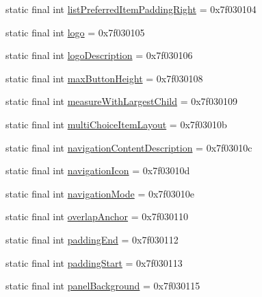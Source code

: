 \begin{DoxyCompactItemize}
\item 
static final int \mbox{\hyperlink{classcom_1_1google_1_1android_1_1gms_1_1R_1_1attr_ad62342bccd24186502c5a787bbd476b5}{list\+Preferred\+Item\+Padding\+Right}} = 0x7f030104
\item 
static final int \mbox{\hyperlink{classcom_1_1google_1_1android_1_1gms_1_1R_1_1attr_a280634c4d3de6b87fbf3f1e89e7efb5d}{logo}} = 0x7f030105
\item 
static final int \mbox{\hyperlink{classcom_1_1google_1_1android_1_1gms_1_1R_1_1attr_a640dccb545bc7628f4e6db51f8054219}{logo\+Description}} = 0x7f030106
\item 
static final int \mbox{\hyperlink{classcom_1_1google_1_1android_1_1gms_1_1R_1_1attr_a02299476fb7ab67a40dc0dd31f397a02}{max\+Button\+Height}} = 0x7f030108
\item 
static final int \mbox{\hyperlink{classcom_1_1google_1_1android_1_1gms_1_1R_1_1attr_a81d342201cb6c67c755cf47c538f899c}{measure\+With\+Largest\+Child}} = 0x7f030109
\item 
static final int \mbox{\hyperlink{classcom_1_1google_1_1android_1_1gms_1_1R_1_1attr_aa44d3c7ba7f50713fb422676563d91e5}{multi\+Choice\+Item\+Layout}} = 0x7f03010b
\item 
static final int \mbox{\hyperlink{classcom_1_1google_1_1android_1_1gms_1_1R_1_1attr_acc258d70880647b3e6018a260189eea3}{navigation\+Content\+Description}} = 0x7f03010c
\item 
static final int \mbox{\hyperlink{classcom_1_1google_1_1android_1_1gms_1_1R_1_1attr_a53d06a7250ee56f3ab640990d1d301f3}{navigation\+Icon}} = 0x7f03010d
\item 
static final int \mbox{\hyperlink{classcom_1_1google_1_1android_1_1gms_1_1R_1_1attr_a395d03f137b00a2001096d315a5b9cf2}{navigation\+Mode}} = 0x7f03010e
\item 
static final int \mbox{\hyperlink{classcom_1_1google_1_1android_1_1gms_1_1R_1_1attr_a0e6609ccb0a6134ddf248a74e25ededd}{overlap\+Anchor}} = 0x7f030110
\item 
static final int \mbox{\hyperlink{classcom_1_1google_1_1android_1_1gms_1_1R_1_1attr_aff68441d9fe55db40d1488cdeffbb9bf}{padding\+End}} = 0x7f030112
\item 
static final int \mbox{\hyperlink{classcom_1_1google_1_1android_1_1gms_1_1R_1_1attr_a85870a976c37b3c8d9a2729989ccb963}{padding\+Start}} = 0x7f030113
\item 
static final int \mbox{\hyperlink{classcom_1_1google_1_1android_1_1gms_1_1R_1_1attr_a1207f5019395df10c6e99ec7eeda4686}{panel\+Background}} = 0x7f030115

\end{DoxyCompactItemize}
